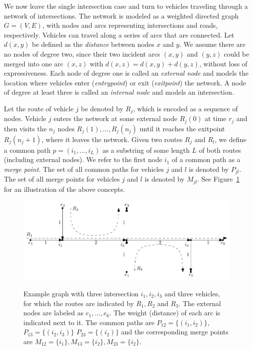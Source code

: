 \documentclass{article}
\theoremstyle{definition}
\theoremstyle{plain}
\begin{document}
We now leave the single intersection case and turn to vehicles traveling through
a network of intersections. The network is modeled as a weighted directed graph
$G=(V,E)$, with nodes and arcs representing intersections and roads,
respectively. Vehicles can travel along a series of arcs that are connected. Let
$d(x,y)$ be defined as the \textit{distance} between nodes $x$ and $y$. We
assume there are no nodes of degree two, since their two incident arcs $(x,y)$
and $(y,z)$ could be merged into one arc $(x,z)$ with
$d(x,z) = d(x,y) + d(y,z)$, without loss of expressiveness. Each node of degree
one is called an \textit{external node} and models the location where vehicles
enter (\textit{entrypoint}) or exit (\textit{exitpoint}) the network. A node of
degree at least three is called an \textit{internal node} and models an
intersection.

Let the route of vehicle $j$ be denoted by $R_{j}$, which is encoded as a
sequence of nodes. Vehicle $j$ enters the network at some external node
$R_{j}(0)$ at time $r_{j}$ and then visits the $n_{j}$ nodes
$R_{j}(1), \dots, R_{j}(n_{j})$ until it reaches the exitpoint
$R_{j}(n_{j} + 1)$, where it leaves the network.
Given two routes $R_{j}$ and $R_{l}$, we define a common path
$p=(i_{1},\dots,i_{L})$ as a substring of some length $L$ of both routes
(including external nodes). We refer to the first node $i_{1}$ of a common path
as a \textit{merge point}. The set of all common paths for vehicles $j$ and $l$
is denoted by $P_{jl}$. The set of all merge points for vehicles $j$ and $l$ is
denoted by $M_{jl}$. See Figure~\ref{fig:intersection-graph-example} for an
illustration of the above concepts.

\begin{figure}[t]
  \centering
  \includegraphics[width=1.0\textwidth]{figures/intersection-graph-example.pdf}
  \label{fig:intersection-graph-example}
  \caption{Example graph with three intersection $i_{1}, i_{2}, i_{3}$ and three
    vehicles, for which the routes are indicated by $R_{1}, R_{2}$ and $R_{3}$.
    The external nodes are labeled as $e_{1}, \dots, e_{6}$. The weight
    (distance) of each arc is indicated next to it. The common paths are
    $P_{12} = \{ (i_{1}, i_{2}) \}$, $P_{13} = \{ (i_{2}, i_{3}) \}$
    $P_{23} = \{ (i_{2}) \}$ and the corresponding merge points are
    $M_{12} = \{ i_{1} \}, M_{13} = \{ i_{2} \}, M_{23} = \{ i_{2} \}$.}
\end{figure}
\end{document}
